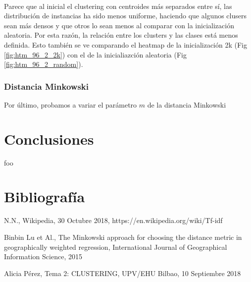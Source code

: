 \documentclass[10pt,a4paper]{article}
\begin{document}
	\paragraph{}
	Parece que al inicial el clustering con centroides más separados entre sí, las distribución de instancias ha sido menos uniforme, haciendo que algunos clusers sean más densos y que otros lo sean menos al comparar con la inicialización aleatoria. Por esta razón, la relación entre los clusters y las clases está menos definida. Esto también se ve comparando el heatmap de la inicialización 2k (Fig \ref{fig:htm_96_2_2k}) con el de la inicialiazción aleatoria (Fig \ref{fig:htm_96_2_random}).
	
	\subsubsection{Distancia Minkowski}
	Por último, probamos a variar el parámetro $m$ de la distancia Minkowski
	
\section{Conclusiones}
	foo
\section{Bibliografía}
\def\section*#1{} %

\begin{thebibliography}{}
N.N., Wikipedia, 30 Octubre 2018, https://en.wikipedia.org/wiki/Tf-idf 

Binbin Lu et Al., The Minkowski approach for choosing the distance metric in geographically weighted regression, International Journal of Geographical Information Science, 2015

Alicia Pérez, Tema 2: CLUSTERING, UPV/EHU Bilbao, 10 Septiembre 2018


\end{thebibliography}
\end{document}
